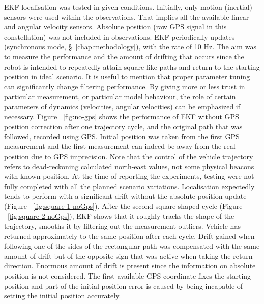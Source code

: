  EKF localisation was tested in given conditions. Initially, only motion (inertial) sensors were used within the observations. That implies all the available linear and angular velocity sensors. Absolute position (raw GPS signal in this constellation) was not included in observations. EKF periodically updates (synchronous mode, \S~\ref{chap:methodology}), with the rate of 10 Hz. The aim was to measure the performance and the amount of drifting that occurs since the robot is intended to repeatedly attain square-like paths and return to the starting position in ideal scenario. It is useful to mention that proper parameter tuning can significantly change filtering performance. By giving more or less trust in particular measurement, or particular model behaviour, the role of certain parameters of dynamics (velocities, angular velocities) can be emphasized if necessary. Figure ~\ref{fig:no-gps} shows the performance of EKF without GPS position correction after one trajectory cycle, and the original path that was followed, recorded using GPS. Initial position was taken from the first GPS measurement and the first measurement can indeed be away from the real position due to GPS imprecision. Note that the control of the vehicle trajectory refers to dead-reckoning calculated north-east values, not some physical beacons with known position. At the time of reporting the experiments, testing were not fully completed with all the planned scenario variations. Localisation expectedly tends to perform with a significant drift without the absolute position update (Figure ~\ref{fig:square-1-noGps}). After the second square-shaped cycle (Figure ~\ref{fig:square-2-noGps}), EKF shows that it roughly tracks the shape of the trajectory, smooths it by filtering out the measurement outliers. Vehicle has returned approximately to the same position after each cycle. Drift gained when following one of the sides of the rectangular path was compensated with the same amount of drift but of the opposite sign that was active when taking the return direction. Enormous amount of drift is present since the information on absolute position is not considered. The first available GPS coordinate fixes the starting position and part of the initial position error is caused by being incapable of setting the initial position accurately.       
